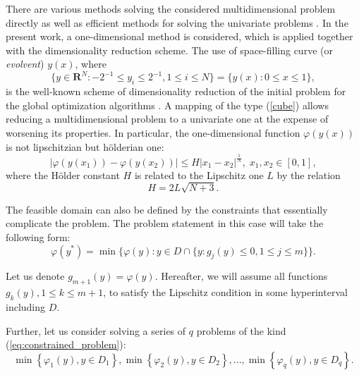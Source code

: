 \documentclass[runningheads]{llncs}
\begin{document}
There are various methods solving the considered multidimensional problem directly
\cite{SergeyevKvasov2017, Jones2009} as well as efficient methods for solving the univariate problems \cite{Norkin1992, Strongin2000}.
In the present work, a one-dimensional method is considered, which is applied together with the
dimensionality reduction scheme.
The use of space-filling curve (or \textit{evolvent}) $y(x)$, where
\begin{equation}
\label{cube}
\lbrace y\in \mathbf{R}^N:-2^{-1}\leqslant y_i\leqslant 2^{-1},1\leqslant i\leqslant
N\rbrace=\{y(x):0\leqslant x\leqslant 1\},
\end{equation}
 is the well-known scheme of dimensionality reduction
 of the initial problem for the global optimization algorithms
\cite{Sergeyev2013}.
A mapping of the type (\ref{cube}) allows reducing a multidimensional problem to a univariate one at the expense of worsening its properties. In particular, the
one-dimensional function \(\varphi(y(x))\) is not lipschitzian but h\"{o}lderian one:
\begin{displaymath}
\label{holder}
|\varphi(y(x_1))-\varphi(y(x_2))|\leqslant H{|x_1-x_2|}^{\frac{1}{N}}, \; x_1,x_2\in[0,1],
\end{displaymath}
where the H\"{o}lder constant \(H\) is related to the Lipschitz one \(L\) by the relation
\begin{displaymath}
  H=2L\sqrt{N+3}.
\end{displaymath}

The feasible domain can also be defined by the constraints that essentially complicate the problem.
The problem statement in this case will take the following form:
\begin{equation}
  \label{eq:constrained_problem}
  \varphi(y^*)=\min\{\varphi(y):y\in D \cap \{y: g_j(y)\leqslant 0, 1\leqslant j\leqslant m\}\}.
\end{equation}

Let us denote \(g_{m+1}(y)=\varphi(y)\). Hereafter, we will assume all functions
\(g_k(y),1\leqslant k \leqslant m+1\),
to satisfy the Lipschitz condition in some hyperinterval including \(D\).

Further, let us consider solving a series of \(q\) problems of the kind
(\ref{eq:constrained_problem}):
\begin{equation}
  \label{eq:many_problems}
  \min\left\{\varphi_1(y), y\in D_1 \right\}, \min\left\{\varphi_2(y), y\in D_2\right\},...,
\min\left\{\varphi_q(y), y\in D_q\right\}.
\end{equation}
\end{document}
